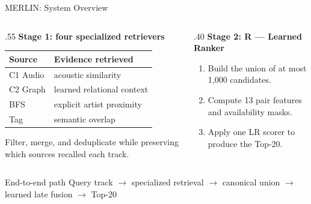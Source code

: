 \documentclass{beamer}
\begin{document}
\begin{frame}{MERLIN: System Overview}

\begin{columns}[T,onlytextwidth]
  \begin{column}{.55\textwidth}
    \textbf{Stage 1: four specialized retrievers}

    \vspace{.14cm}
    \small
    \begin{tabular}{@{}ll@{}}
      \toprule
      \textbf{Source} & \textbf{Evidence retrieved} \\
      \midrule
      C1 Audio & acoustic similarity \\
      C2 Graph & learned relational context \\
      BFS & explicit artist proximity \\
      Tag & semantic overlap \\
      \bottomrule
    \end{tabular}

    \vspace{.3cm}
    Filter, merge, and deduplicate while preserving which sources recalled each track.
  \end{column}
  \begin{column}{.40\textwidth}
    \textbf{Stage 2: R --- Learned Ranker}

    \vspace{.1cm}
    \begin{enumerate}
      \item Build the union of at most 1,000 candidates.
      \item Compute 13 pair features and availability masks.
      \item Apply one LR scorer to produce the Top-20.
    \end{enumerate}
  \end{column}
\end{columns}

\vspace{.35cm}
\begin{block}{End-to-end path}
  \centering
  Query track $\rightarrow$ specialized retrieval $\rightarrow$ canonical union
  $\rightarrow$ learned late fusion $\rightarrow$ Top-20
\end{block}

\end{frame}
\end{document}
